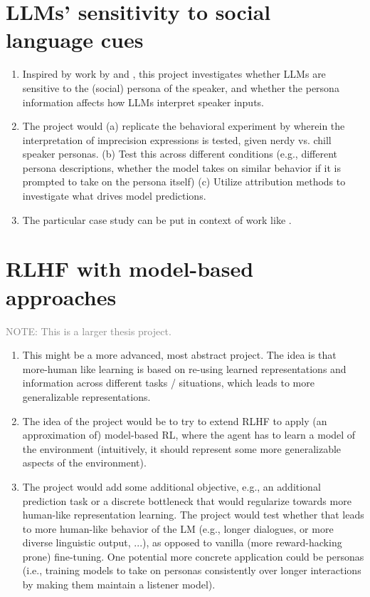 \documentclass[fleqn,reqno,10pt]{article}
\begin{document}
\section{LLMs' sensitivity to social language cues}
\begin{enumerate}
	\item Inspired by work by \citet{burnett2019signalling} and \citet{beltrama2021imprecision}, this project investigates whether LLMs are sensitive to the (social) persona of the speaker, and whether the persona information affects how LLMs interpret speaker inputs.  
	\item The project would (a) replicate the behavioral experiment by \citet{beltrama2021imprecision} wherein the interpretation of imprecision expressions is tested, given nerdy vs. chill speaker personas. (b) Test this across different conditions (e.g., different persona descriptions, whether the model takes on similar behavior if it is prompted to take on the persona itself) (c) Utilize attribution methods to investigate what drives model predictions.
	\item The particular case study can be put in context of work like \citet{liu2024largelanguagemodelsnavigate}.
\end{enumerate}

\section{RLHF with model-based approaches}
\textcolor{gray}{NOTE: This is a larger thesis project.}
\begin{enumerate}
	\item This might be a more advanced, most abstract project. The idea is that more-human like learning is based on re-using learned representations and information across different tasks / situations, which leads to more generalizable representations. 
	\item The idea of the project would be to try to extend RLHF to apply (an approximation of) model-based RL, where the agent has to learn a model of the environment (intuitively, it should represent some more generalizable aspects of the environment). 
	\item The project would add some additional objective, e.g., an additional prediction task or a discrete bottleneck that would regularize towards more human-like representation learning. The project would test whether that leads to more human-like behavior of the LM (e.g., longer dialogues, or more diverse linguistic output, ...), as opposed to vanilla (more reward-hacking prone) fine-tuning.  One potential more concrete application could be personas (i.e., training models to take on personas consistently over longer interactions by making them maintain a listener model).
\end{enumerate}

\printbibliography[heading=bibintoc]
\end{document}
